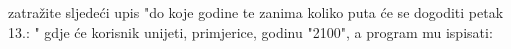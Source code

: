 \documentclass{exam}
\begin{document}
\begin{itemize}
                                                                                    zatražite
                                                                                    sljedeći
                                                                                    upis
                                                                                    "do
                                                                                    koje
                                                                                    godine
                                                                                    te
                                                                                    zanima
                                                                                    koliko
                                                                                    puta
                                                                                    će
                                                                                    se
                                                                                    dogoditi
                                                                                    petak
                                                                                    13.:
                                                                                    "
                                                                                    gdje
                                                                                    će
                                                                                    korisnik
                                                                                    unijeti,
                                                                                    primjerice,
                                                                                    godinu
                                                                                    "2100",
                                                                                    a
                                                                                    program
                                                                                    mu
                                                                                    ispisati:
                                                                                            

\end{itemize}
\end{document}
